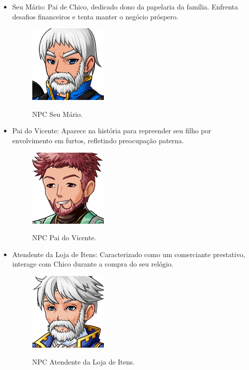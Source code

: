 \begin{itemize}
	\item Seu Mário: Pai de Chico, dedicado dono da papelaria da família. Enfrenta desafios financeiros e tenta manter o negócio próspero.
	      \begin{figure}[ht]
		      \centering
		      \caption{NPC Seu Mário.}
		      \includegraphics[scale=0.8]{Textuais/Pictures/Seu_Mario.png}
		      \label{fig:npc-seu-mario}
	      \end{figure}
	\item Pai do Vicente: Aparece na história para repreender seu filho por envolvimento em furtos, refletindo preocupação paterna.
	      \begin{figure}[ht]
		      \centering
		      \caption{NPC Pai do Vicente.}
		      \includegraphics[scale=0.8]{Textuais/Pictures/Pai_Vicente.png}
		      \label{fig:npc-pai-vicente}
	      \end{figure}
	\item Atendente da Loja de Itens: Caracterizado como um comerciante prestativo, interage com Chico durante a compra do seu relógio.
	      \begin{figure}[ht]
		      \centering
		      \caption{NPC Atendente da Loja de Itens.}
		      \includegraphics[scale=0.8]{Textuais/Pictures/Atendente_loja_Itens.png}
		      \label{fig:npc-atendente-loja-itens}
	      \end{figure}


\end{itemize}
